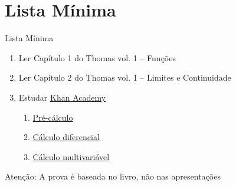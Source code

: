 \documentclass[fleqn,utf8,aspectratio=169,12pt,ignorenonframetext]{beamer}
\begin{document}
\section{Lista Mínima}

\begin{frame}{Lista Mínima}
  \begin{enumerate}
    \item Ler Capítulo 1 do Thomas vol. 1 -- Funções
    \item Ler Capítulo 2 do Thomas vol. 1 -- Limites e Continuidade
    \item Estudar \href{https://pt.khanacademy.org}{Khan Academy}
    \begin{enumerate}
      \item \href{https://pt.khanacademy.org/math/precalculus}{Pré-cálculo}
      \item \href{https://pt.khanacademy.org/math/differential-calculus}{Cálculo diferencial}
      \item \href{https://pt.khanacademy.org/math/multivariable-calculus}{Cálculo multivariável}
    \end{enumerate}
  \end{enumerate}

  \vfill
  Atenção: A prova é baseada no livro, não nas apresentações
\end{frame}

\end{document}
